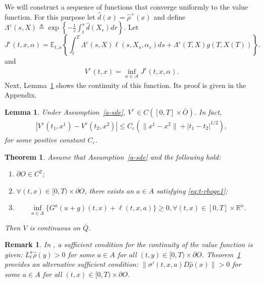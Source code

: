 \documentclass[11pt,reqno]{amsart}
\numberwithin{equation}{section}
\newtheorem{thm}{Theorem}[section]
\newtheorem{lem}{Lemma}[section]
\newtheorem{rem}{Remark}[section]
\newcommand{\thmref}[1]{Theorem~{\rm \ref{#1}}}
\newcommand{\lemref}[1]{Lemma~{\rm \ref{#1}}}
\newcommand{\asmref}[1]{Assumption~{\rm \ref{#1}}}
\begin{document}
We will construct a sequence of functions that converge uniformly to
the value function. 
For this purpose let $\hat d(x) = \hat \rho^+(x)$ and define 
$
  \Lambda^\varepsilon(s, X)\triangleq \displaystyle \exp \left\{- \frac 1
  \varepsilon \int_t^s \hat d (X_r) dr \right\}.$
Let 
\begin{equation}
  \label{eq:coste}
  J^\varepsilon (t,x,\alpha) = \mathbb{E}_{t,x}\left \{ \int_t^T
\Lambda^\varepsilon(s, X) \ell(s, X_s, \alpha_s) ds +
\Lambda^\varepsilon(T, X) g(T, X(T))\right\}.
\end{equation}
and
\begin{equation}\label{eq:value-func-eps}
\begin{array}{ll}
  V^\varepsilon(t,x) = \inf_{\alpha\in \mathcal{A}} J^\varepsilon(t,x,\alpha).
\end{array}
\end{equation}
Next, \lemref{l-vecon}  shows the continuity of
this function. Its proof is given in the Appendix.
\begin{lem}
  \label{l-vecon}
Under \asmref{a-sde}, $V^\varepsilon \in
C([0,T]\times \bar O)$. In fact,
$$\begin{array}{ll}
  |V^\varepsilon(t_1,x^1) - V^\varepsilon(t_2,x^2)| \le
  C_{\varepsilon}(\|x^1-x^2\| + |t_1-t_2|^{1/2}),
\end{array}$$
for some positive constant $C_{\varepsilon}$.
\end{lem}


\begin{thm} \label{t-vctn}
Assume that \asmref{a-sde} and the following hold:
 \begin{enumerate}
  \item $\partial O \in C^2$; 
  \item  $\forall (t,x) \in [0,T) \times \partial O$, there exists an
    $a\in A$ satisfying \eqref{eq:t-rhoge1};
          \item 
    \begin{equation}\label{eq:a-conp2}
      \inf_{a\in A} \{G^a (u + g) (t,x) + \ell(t,x, a)\} \ge 0, \forall
      (t,x) \in  [0,T]\times \mathbb{R}^n.
    \end{equation}
  \end{enumerate}
Then $V$ is continuous on $\bar Q$. 
\end{thm}

\begin{rem}
In \cite[Pages 202-203]{FS06}, a sufficient condition for the continuity of the value function is given: $L_t^a \hat \rho (y)>0$ for some $a\in A$ for all $(t, y) \in [0,T)
\times \partial O$.
\thmref{t-vctn} provides an alternative sufficient condition:
$\|\sigma'(t,x,a) D\hat \rho(x)\|>0$ for some $a\in A$ for all $(t,x)
\in [0,T) \times \partial O$.
\end{rem}
\end{document}
